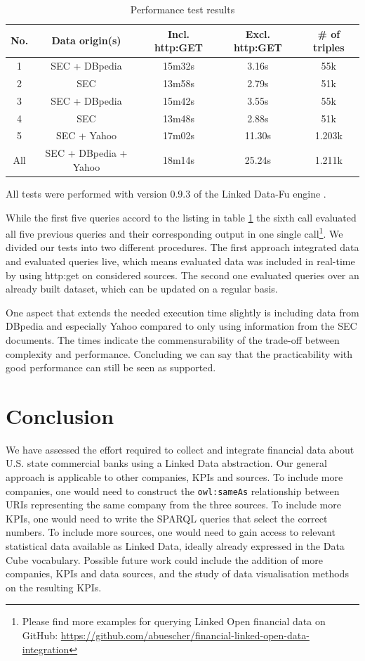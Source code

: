 \documentclass[runningheads]{llncs}
\begin{document}
\begin{table}
\centering
\begin{tabular}{|c|c|c|c|c|}
\hline
\textbf{No.} & \textbf{Data origin(s)} & \textbf{Incl. http:GET} & \textbf{Excl. http:GET} & \textbf{\# of triples}\\
\hline
\hline
1 & SEC + DBpedia & 15m32s & 3.16s & 55k\\
\hline
2 & SEC & 13m58s & 2.79s & 51k\\
\hline
3 & SEC + DBpedia & 15m42s & 3.55s & 55k\\
\hline
4 & SEC & 13m48s & 2.88s & 51k\\
\hline
5 & SEC + Yahoo & 17m02s & 11.30s & 1.203k\\
\hline
All & SEC + DBpedia + Yahoo & 18m14s & 25.24s & 1.211k\\
\hline
\end{tabular}
\caption{Performance test results}\label{tbl:perf}
\end{table}

All tests were performed with version 0.9.3 of the Linked Data-Fu engine \cite{SSHS13}.

While the first five queries accord to the listing in table \ref{tbl:perf} the sixth call evaluated all five previous queries and their corresponding output in one single call\footnote{Please find more examples for querying Linked Open financial data on GitHub: \url{https://github.com/abuescher/financial-linked-open-data-integration}}.
We divided our tests into two different procedures.
The first approach integrated data and evaluated queries live, which means evaluated data was included in real-time by using http:get on considered sources.
The second one evaluated queries over an already built dataset, which can be updated on a regular basis.

One aspect that extends the needed execution time slightly is including data from DBpedia and especially Yahoo compared to only using information from the SEC documents.
The times indicate the commensurability of the trade-off between complexity and performance.
Concluding we can say that the practicability with good performance can still be seen as supported.

\section{Conclusion}\label{c6}

We have assessed the effort required to collect and integrate financial data about U.S. state commercial banks using a Linked Data abstraction.
Our general approach is applicable to other companies, KPIs and sources.
To include more companies, one would need to construct the {\tt owl:sameAs} relationship between URIs representing the same company from the three sources.
To include more KPIs, one would need to write the SPARQL queries that select the correct numbers.
To include more sources, one would need to gain access to relevant statistical data available as Linked Data, ideally already expressed in the Data Cube vocabulary.
Possible future work could include the addition of more companies, KPIs and data sources, and the study of data visualisation methods on the resulting KPIs.
\end{document}
